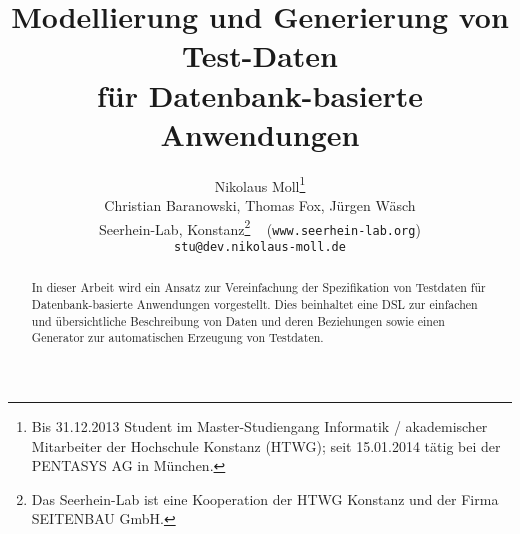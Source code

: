 \documentclass{lni}
\author{
	Nikolaus Moll\footnote{Bis 31.12.2013 Student im Master-Studiengang Informatik / akademischer Mitarbeiter der Hochschule Konstanz (HTWG); seit 15.01.2014 tätig bei der PENTASYS AG in München.}
\\ Christian Baranowski, Thomas Fox, Jürgen Wäsch \\ 
Seerhein-Lab, Konstanz\footnote{Das Seerhein-Lab ist eine Kooperation der HTWG Konstanz und der Firma SEITENBAU GmbH.} \texttt{ } (\texttt{www.seerhein-lab.org})\\ 
           \texttt{stu@dev.nikolaus-moll.de}
}
\title{Modellierung und Generierung von Test-Daten\\ für Datenbank-basierte Anwendungen}
\begin{document}
\maketitle




\begin{abstract}
%
In dieser Arbeit wird ein Ansatz zur Vereinfachung der Spezifikation von Testdaten für Datenbank-basierte Anwendungen vorgestellt. 
%
Dies beinhaltet eine DSL zur einfachen und übersichtliche Beschreibung von Daten und deren Beziehungen sowie einen Generator zur automatischen Erzeugung von Testdaten. 
%
%

%

\end{abstract}
















\end{document}
